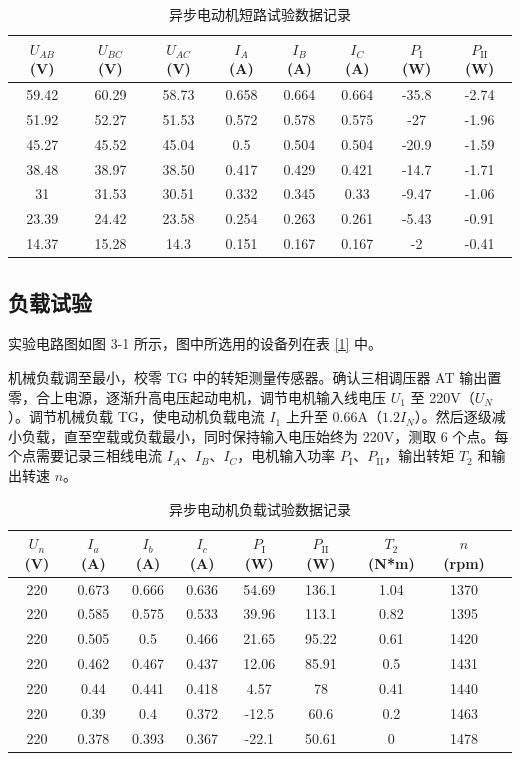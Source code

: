 \documentclass[12pt,a4paper]{article}
\begin{document}
\begin{table}[H]
\centering
\caption{异步电动机短路试验数据记录}
\begin{tabular}{cccccccc}
\toprule
$U_{AB}$ (V) & $U_{BC}$ (V) & $U_{AC}$ (V) & $I_A$ (A) & $I_B$ (A) & $I_C$ (A) & $P_{\text{I}}$ (W) & $P_{\text{II}}$ (W) \\
\midrule
59.42 & 60.29 & 58.73 & 0.658 & 0.664 & 0.664 & -35.8 & -2.74 \\
51.92 & 52.27 & 51.53 & 0.572 & 0.578 & 0.575 & -27 & -1.96 \\
45.27 & 45.52 & 45.04 & 0.5 & 0.504 & 0.504 & -20.9 & -1.59 \\
38.48 & 38.97 & 38.50 & 0.417 & 0.429 & 0.421 & -14.7 & -1.71 \\
31 & 31.53 & 30.51 & 0.332 & 0.345 & 0.33 & -9.47 & -1.06 \\
23.39 & 24.42 & 23.58 & 0.254 & 0.263 & 0.261 & -5.43 & -0.91 \\
14.37 & 15.28 & 14.3 & 0.151 & 0.167 & 0.167 & -2 & -0.41 \\
\bottomrule
\end{tabular}
\label{2}
\end{table}

\subsection{负载试验}

实验电路图如图 3-1 所示，图中所选用的设备列在表 \ref{1} 中。

机械负载调至最小，校零 TG 中的转矩测量传感器。确认三相调压器 AT 输出置零，合上电源，逐渐升高电压起动电机，调节电机输入线电压 $U_1$ 至 220V（$U_N$）。调节机械负载 TG，使电动机负载电流 $I_1$ 上升至 0.66A（$1.2I_N$）。然后逐级减小负载，直至空载或负载最小，同时保持输入电压始终为 220V，测取 6 个点。每个点需要记录三相线电流 $I_A$、$I_B$、$I_C$，电机输入功率 $P_{\text{I}}$、$P_{\text{II}}$，输出转矩 $T_2$ 和输出转速 $n$。

\begin{table}[H]
\centering
\caption{异步电动机负载试验数据记录}
\begin{tabular}{ccccccccc}
\toprule
$U_{n}$ (V) & $I_a$ (A) & $I_{b}$ (A) & $I_c$ (A) & $P_{\text{I}}$ (W) & $P_{\text{II}}$ (W) & $T_{2}$ (N*m) & $n$ (rpm) \\
\midrule
220&	0.673&	0.666&	0.636&	54.69&	136.1&	1.04&	1370\\
220&	0.585&	0.575&	0.533&	39.96&	113.1&	0.82&	1395\\
220&	0.505&	0.5&	0.466&	21.65&	95.22&	0.61&	1420\\
220&	0.462&	0.467&	0.437&	12.06&	85.91&	0.5&	1431\\
220&	0.44&	0.441&	0.418&	4.57&	78&	0.41&	1440\\
220&	0.39&	0.4&	0.372&	-12.5&	60.6&	0.2&	1463\\
220&	0.378&	0.393&	0.367&	-22.1&	50.61&	0&	1478\\
\bottomrule
\end{tabular}
\end{table}
\end{document}
